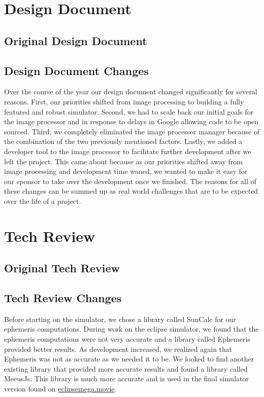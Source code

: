 \documentclass[10pt, onecolumn, draftclsnofoot, letterpaper, compsoc]{IEEEtran}
\begin{document}
\section{Design Document}

\subsection{Original Design Document}


\subsection{Design Document Changes}

Over the course of the year our design document changed significantly for several reasons.
First, our priorities shifted from image processing to building a fully featured and
robust simulator. Second, we had to scale back our initial goals for the image processor
and in response to delays in Google allowing code to be open sourced. Third, we
completely eliminated the image processor manager because of the combination of the
two previously mentioned factors. Lastly, we added a developer tool to the image processor
to facilitate further development after we left the project. This came about because as
our priorities shifted away from image processing and development time waned, we wanted to
make it easy for our sponsor to take over the development once we finished. The reasons for
all of these changes can be summed up as real world challenges that are to be expected over
the life of a project.

\section{Tech Review}

\subsection{Original Tech Review}


\subsection{Tech Review Changes}
Before starting on the simulator, we chose a library called SunCalc for our
ephemeris computations.
During work on the eclipse simulator, we found that the ephemeris
computations were not very accurate and a library called Ephemeris provided
better results. As development increased, we realized again that Ephemeris
was not as accurate as we needed it to be. We looked to find another existing
library that provided more accurate results and found a library called
MeeusJs. This library is much more accurate and is used in the final simulator
version found on \href{https://eclipsemega.movie}{eclipsemega.movie}.
\end{document}
